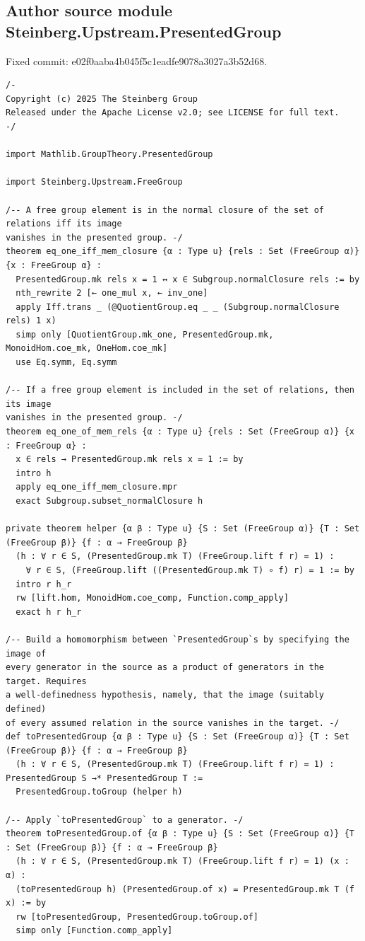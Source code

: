 \documentclass[10pt,a4paper]{article}
\begin{document}
\subsection*{Author source module Steinberg.Upstream.PresentedGroup}
\noindent Fixed commit: e02f0aaba4b045f5c1eadfe9078a3027a3b52d68.
\begin{Verbatim}
/-
Copyright (c) 2025 The Steinberg Group
Released under the Apache License v2.0; see LICENSE for full text.
-/

import Mathlib.GroupTheory.PresentedGroup

import Steinberg.Upstream.FreeGroup

/-- A free group element is in the normal closure of the set of relations iff its image
vanishes in the presented group. -/
theorem eq_one_iff_mem_closure {α : Type u} {rels : Set (FreeGroup α)} {x : FreeGroup α} :
  PresentedGroup.mk rels x = 1 ↔ x ∈ Subgroup.normalClosure rels := by
  nth_rewrite 2 [← one_mul x, ← inv_one]
  apply Iff.trans _ (@QuotientGroup.eq _ _ (Subgroup.normalClosure rels) 1 x)
  simp only [QuotientGroup.mk_one, PresentedGroup.mk, MonoidHom.coe_mk, OneHom.coe_mk]
  use Eq.symm, Eq.symm

/-- If a free group element is included in the set of relations, then its image
vanishes in the presented group. -/
theorem eq_one_of_mem_rels {α : Type u} {rels : Set (FreeGroup α)} {x : FreeGroup α} :
  x ∈ rels → PresentedGroup.mk rels x = 1 := by
  intro h
  apply eq_one_iff_mem_closure.mpr
  exact Subgroup.subset_normalClosure h

private theorem helper {α β : Type u} {S : Set (FreeGroup α)} {T : Set (FreeGroup β)} {f : α → FreeGroup β}
  (h : ∀ r ∈ S, (PresentedGroup.mk T) (FreeGroup.lift f r) = 1) :
    ∀ r ∈ S, (FreeGroup.lift ((PresentedGroup.mk T) ∘ f) r) = 1 := by
  intro r h_r
  rw [lift.hom, MonoidHom.coe_comp, Function.comp_apply]
  exact h r h_r

/-- Build a homomorphism between `PresentedGroup`s by specifying the image of
every generator in the source as a product of generators in the target. Requires
a well-definedness hypothesis, namely, that the image (suitably defined)
of every assumed relation in the source vanishes in the target. -/
def toPresentedGroup {α β : Type u} {S : Set (FreeGroup α)} {T : Set (FreeGroup β)} {f : α → FreeGroup β}
  (h : ∀ r ∈ S, (PresentedGroup.mk T) (FreeGroup.lift f r) = 1) : PresentedGroup S →* PresentedGroup T :=
  PresentedGroup.toGroup (helper h)

/-- Apply `toPresentedGroup` to a generator. -/
theorem toPresentedGroup.of {α β : Type u} {S : Set (FreeGroup α)} {T : Set (FreeGroup β)} {f : α → FreeGroup β}
  (h : ∀ r ∈ S, (PresentedGroup.mk T) (FreeGroup.lift f r) = 1) (x : α) :
  (toPresentedGroup h) (PresentedGroup.of x) = PresentedGroup.mk T (f x) := by
  rw [toPresentedGroup, PresentedGroup.toGroup.of]
  simp only [Function.comp_apply]


\end{Verbatim}
\end{document}
